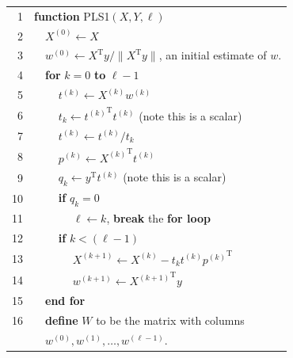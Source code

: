 \documentclass[preprint,12pt]{elsarticle}
\begin{document}
\begin{table}[ht]
    \centering
    {\ttfamily
        \begin{tabular}{|r l l l l|}
            \hline
            \rowcolor{backcolour} 1 & \multicolumn{4}{l|}{\textbf{function} PLS1$\left(X, Y, \ell\right)$} \\
            \rowcolor{backcolour} 2 & & \multicolumn{3}{l|}{$X^{(0)}\gets X$} \\
            \rowcolor{backcolour} 3 & & \multicolumn{3}{l|}{$w^{(0)}\gets X^{\mathrm{T}}y/\|X^{\mathrm{T}}y\|$, an initial estimate of $w$.} \\
            \rowcolor{backcolour} 4 & & \multicolumn{3}{l|}{\textbf{for} $k=0$ \textbf{to} $\ell -1$} \\
            \rowcolor{backcolour} 5 & & & \multicolumn{2}{l|}{$t^{(k)}\gets X^{(k)}w^{(k)}$} \\
            \rowcolor{backcolour} 6 & & & \multicolumn{2}{l|}{$t_{k}\gets {t^{(k)}}^{\mathrm{T}}t^{(k)}$ (note this is a scalar)} \\
            \rowcolor{backcolour} 7 & & & \multicolumn{2}{l|}{$t^{(k)}\gets t^{(k)}/t_{k}$} \\
            \rowcolor{backcolour} 8 & & & \multicolumn{2}{l|}{$p^{(k)}\gets {X^{(k)}}^{\mathrm{T}}t^{(k)}$} \\
            \rowcolor{backcolour} 9 & & & \multicolumn{2}{l|}{$q_{k}\gets {y}^{\mathrm{T}}t^{(k)}$ (note this is a scalar)} \\
            \rowcolor{backcolour} 10 & & & \multicolumn{2}{l|}{\textbf{if} $q_{k}=0$} \\
            \rowcolor{backcolour} 11 & & & & $\ell \gets k$, \textbf{break} the \textbf{for loop} \\
            \rowcolor{backcolour} 12 & & & \multicolumn{2}{l|}{\textbf{if} $k<(\ell -1)$} \\
            \rowcolor{backcolour} 13 & & & & $X^{(k+1)}\gets X^{(k)}-t_{k}t^{(k)} {p^{(k)}}^{\mathrm{T}}$ \\
            \rowcolor{backcolour} 14 & & & & $w^{(k+1)}\gets {X^{(k+1)}}^{\mathrm{T}}y$ \\
            \rowcolor{backcolour} 15 & & \multicolumn{3}{l|}{\textbf{end for}} \\
            \rowcolor{backcolour} 16 & & \multicolumn{3}{l|}{\textbf{define} $W$ to be the matrix with columns} \\
            \rowcolor{backcolour} & & \multicolumn{3}{l|}{$w^{(0)},w^{(1)},\ldots ,w^{(\ell -1)}$.} \\

\end{tabular}}
\end{table}
\end{document}
